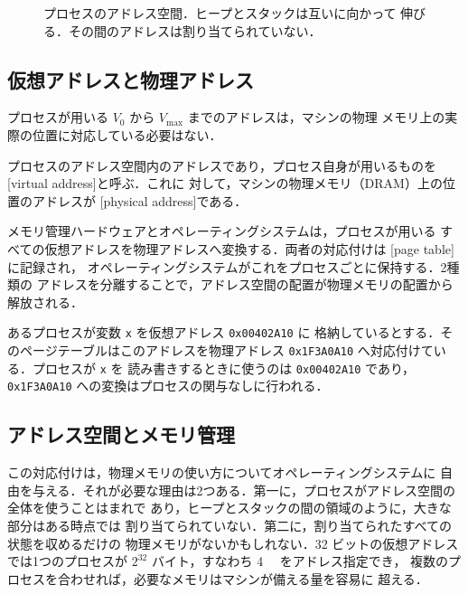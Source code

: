 \documentclass[../main.tex]{subfiles}
\begin{document}
\begin{figure}[htbp]
  \centering
  
  \caption{プロセスのアドレス空間．ヒープとスタックは互いに向かって
    伸びる．その間のアドレスは割り当てられていない．}
  \label{fig:l02-address-space}
\end{figure}

\subsection{仮想アドレスと物理アドレス}

プロセスが用いる $V_0$ から $V_{\max}$ までのアドレスは，マシンの物理
メモリ上の実際の位置に対応している必要はない．

\begin{definition}[仮想アドレスと物理アドレス]
  プロセスのアドレス空間内のアドレスであり，プロセス自身が用いるものを
  [virtual address]と呼ぶ．これに
  対して，マシンの物理メモリ（DRAM）上の位置のアドレスが
  [physical address]である．
\end{definition}

メモリ管理ハードウェアとオペレーティングシステムは，プロセスが用いる
すべての仮想アドレスを物理アドレスへ変換する．両者の対応付けは
[page table]に記録され，
オペレーティングシステムがこれをプロセスごとに保持する．2種類の
アドレスを分離することで，アドレス空間の配置が物理メモリの配置から
解放される．

\begin{example}
  あるプロセスが変数 \texttt{x} を仮想アドレス \texttt{0x00402A10} に
  格納しているとする．そのページテーブルはこのアドレスを物理アドレス
  \texttt{0x1F3A0A10} へ対応付けている．プロセスが \texttt{x} を
  読み書きするときに使うのは \texttt{0x00402A10} であり，
  \texttt{0x1F3A0A10} への変換はプロセスの関与なしに行われる．%
\end{example}

\subsection{アドレス空間とメモリ管理}

この対応付けは，物理メモリの使い方についてオペレーティングシステムに
自由を与える．それが必要な理由は2つある．第一に，プロセスがアドレス空間の全体を使うことはまれで
あり，ヒープとスタックの間の領域のように，大きな部分はある時点では
割り当てられていない．第二に，割り当てられたすべての状態を収めるだけの
物理メモリがないかもしれない．32 ビットの仮想アドレスでは1つのプロセスが
$2^{32}$ バイト，すなわち \SI{4}{\gibi\byte} をアドレス指定でき，
複数のプロセスを合わせれば，必要なメモリはマシンが備える量を容易に
超える．
\end{document}
